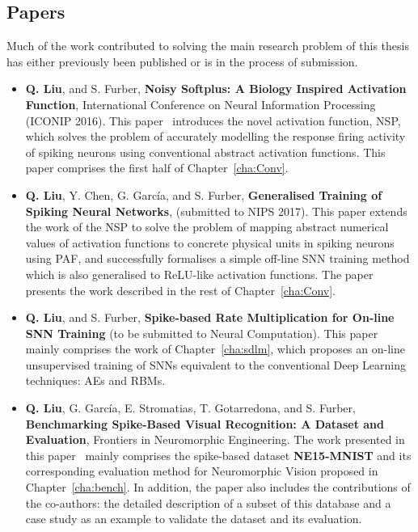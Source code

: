 \subsection{Papers}
	Much of the work contributed to solving the main research problem of this thesis has either previously been published or is in the process of submission.
\begin{itemize}

	\item 
	\textbf{Q. Liu}, and S. Furber, \textbf{Noisy Softplus: A Biology Inspired Activation Function}, International Conference on Neural Information Processing (ICONIP 2016). 
	This paper~\citep{liu2016noisy} introduces the novel activation function, NSP, 
	which solves the problem of accurately modelling the response firing activity of spiking neurons using conventional abstract activation functions.
	This paper comprises the first half of Chapter~\ref{cha:Conv}.
	
	\item 
	\textbf{Q. Liu}, Y. Chen, G. Garc\'ia, and S. Furber, \textbf{Generalised Training of Spiking Neural Networks}, (submitted to NIPS 2017).
	This paper extends the work of the NSP to solve the problem of mapping abstract numerical values of activation functions to concrete physical units in spiking neurons using PAF, and successfully formalises a simple off-line SNN training method which is also generalised to ReLU-like activation functions.
	The paper presents the work described in the rest of Chapter~\ref{cha:Conv}.
	
	
	\item 
	\textbf{Q. Liu}, and S. Furber, \textbf{Spike-based Rate Multiplication for On-line SNN Training} (to be submitted to Neural Computation).
	This paper mainly comprises the work of Chapter~\ref{cha:sdlm}, which proposes an on-line unsupervised training of SNNs equivalent to the conventional Deep Learning techniques: AEs and RBMs.
	
	\item 
	\textbf{Q. Liu}, G. Garc\'ia, E. Stromatias, T. Gotarredona, and S. Furber, \textbf{Benchmarking Spike-Based Visual Recognition: A Dataset and Evaluation}, Frontiers in Neuromorphic Engineering.
	The work presented in this paper~\citep{liu2016bench} mainly comprises the spike-based dataset \textbf{NE15-MNIST} and its corresponding evaluation method for Neuromorphic Vision proposed in Chapter~\ref{cha:bench}.
	In addition, the paper also includes the contributions of the co-authors: the detailed description of a subset of this database and a case study as an example to validate the dataset and its evaluation. 
	
\end{itemize}

